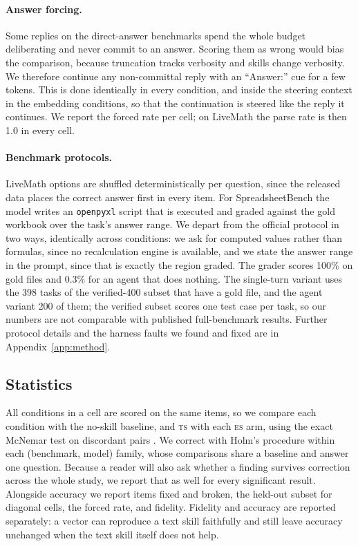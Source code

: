 \documentclass[11pt]{article}
\newcommand{\TS}{\textsc{ts}}
\newcommand{\ES}{\textsc{es}}
\begin{document}
\paragraph{Answer forcing.} Some replies on the direct-answer benchmarks spend the whole budget
deliberating and never commit to an answer. Scoring them as wrong would bias the comparison, because
truncation tracks verbosity and skills change verbosity. We therefore continue any non-committal
reply with an ``Answer:'' cue for a few tokens. This is done identically in every condition, and
inside the steering context in the embedding conditions, so that the continuation is steered like
the reply it continues. We report the forced rate per cell; on LiveMath the parse rate is then 1.0
in every cell.

\paragraph{Benchmark protocols.} LiveMath options are shuffled deterministically per question, since
the released data places the correct answer first in every item. For SpreadsheetBench the model
writes an \texttt{openpyxl} script that is executed and graded against the gold workbook over the
task's answer range. We depart from the official protocol in two ways, identically across
conditions: we ask for computed values rather than formulas, since no recalculation engine is
available, and we state the answer range in the prompt, since that is exactly the region graded.
The grader scores 100\% on gold files and 0.3\% for an agent that does nothing. The single-turn
variant uses the 398 tasks of the verified-400 subset that have a gold file, and the agent variant
200 of them; the verified subset scores one test case per task, so our numbers are not comparable
with published full-benchmark results. Further protocol details and the harness faults we found and
fixed are in Appendix~\ref{app:method}.

\subsection{Statistics}
\label{sec:stats}

All conditions in a cell are scored on the same items, so we compare each condition with the
no-skill baseline, and \TS{} with each \ES{} arm, using the exact McNemar test on discordant pairs
\citep{mcnemar1947,dietterich1998}. We correct with Holm's procedure \citep{holm1979} within each
(benchmark, model) family, whose comparisons share a baseline and answer one question. Because a
reader will also ask whether a finding survives correction across the whole study, we report that as
well for every significant result. Alongside accuracy we report items fixed and broken, the
held-out subset for diagonal cells, the forced rate, and fidelity. Fidelity and accuracy are
reported separately: a vector can reproduce a text skill faithfully and still leave accuracy
unchanged when the text skill itself does not help.
\end{document}

